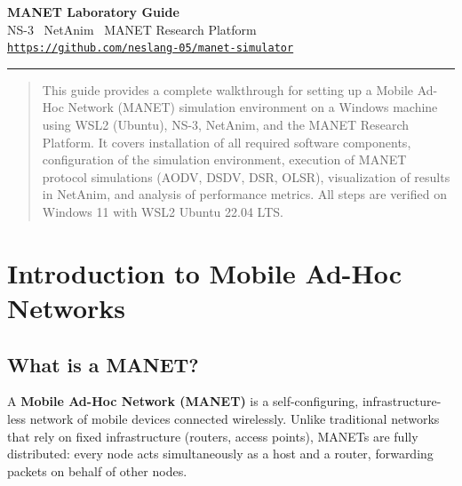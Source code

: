 \documentclass[12pt,a4paper]{article}
\begin{document}

\begin{center}
  {\huge\bfseries\color{darkblue} MANET Laboratory Guide}\\[0.6em]
  {\large\color{gray} NS-3 \textbullet\ NetAnim \textbullet\ MANET Research Platform}\\[0.3em]
  {\normalsize\href{https://github.com/neslang-05/manet-simulator}{\texttt{https://github.com/neslang-05/manet-simulator}}}\\[1em]
  \hrule height 1.5pt
\end{center}

\vspace{0.5em}

\begin{abstract}
This guide provides a complete walkthrough for setting up a Mobile Ad-Hoc Network (MANET) simulation environment on a Windows machine using WSL2 (Ubuntu), NS-3, NetAnim, and the MANET Research Platform. It covers installation of all required software components, configuration of the simulation environment, execution of MANET protocol simulations (AODV, DSDV, DSR, OLSR), visualization of results in NetAnim, and analysis of performance metrics. All steps are verified on Windows 11 with WSL2 Ubuntu 22.04 LTS.
\end{abstract}

\tableofcontents

\newpage

\section{Introduction to Mobile Ad-Hoc Networks}

\subsection{What is a MANET?}

A \textbf{Mobile Ad-Hoc Network (MANET)} is a self-configuring, infrastructure-less network of mobile devices connected wirelessly. Unlike traditional networks that rely on fixed infrastructure (routers, access points), MANETs are fully distributed: every node acts simultaneously as a host and a router, forwarding packets on behalf of other nodes.
\end{document}
